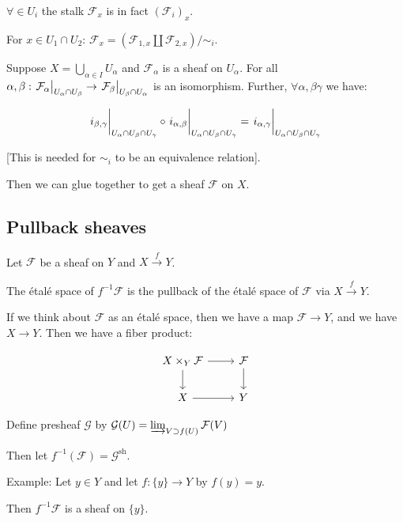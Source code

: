 \documentclass{article}
\theoremstyle{definition}
\begin{document}
    \(\forall \in U_i\) the stalk \(\mathcal{F}_x\) is in fact \((\mathcal{F}_i)_x\).

    For \(x\in U_1\cap U_2\): \(\mathcal{F}_x = (\mathcal{F}_{1,x} \coprod \mathcal{F}_{2,x}) / \sim_i\).

    Suppose \(X = \bigcup_{\alpha \in I} U_\alpha\) and \(\mathcal{F}_\alpha\) is a sheaf on \(U_\alpha\). For all \(\alpha , \beta : \eval{\mathcal{F}_\alpha}_{U_\alpha \cap U_\beta} \to \eval{\mathcal{F}_\beta}_{U_\beta \cap U_\alpha}\) is an isomorphism. Further, \(\forall \alpha ,\beta \gamma\) we have:

    \[
        \eval{i_{\beta, \gamma}}_{U_\alpha \cap U_\beta \cap U_\gamma} \circ \eval{i_{\alpha , \beta}}_{U_\alpha \cap U_\beta \cap U_\gamma} = \eval{i_{\alpha , \gamma}}_{U_\alpha \cap U_\beta \cap U_\gamma}
    \]

    [This is needed for \(\sim_i\) to be an equivalence relation].

    Then we can glue together to get a sheaf \(\mathcal{F}\) on \(X\).

    \subsection*{Pullback sheaves}

    Let \(\mathcal{F}\) be a sheaf on \(Y\) and \(X \xrightarrow{f} Y\).

    The \'etal\'e space of \(f^{-1} \mathcal{F}\) is the pullback of the \'etal\'e space of \(\mathcal{F}\) via \(X \xrightarrow{f} Y\).

    If we think about \(\mathcal{F}\) as an \'etal\'e space, then we have a map \(\mathcal{F} \to Y\), and we have \(X \to Y\). Then we have a fiber product:

    \[
        \begin{tikzcd}
            X \times_Y \mathcal{F} \ar[r] \ar[d] & \mathcal{F} \ar[d] \\ X \ar[r] & Y
        \end{tikzcd}
    \]

    Define presheaf \(\mathcal{G}\) by \(\mathcal{G}(U) = \varinjlim_{V \supset f(U)} \mathcal{F}(V)\)

    Then let \(f^{-1} (\mathcal{F}) = \mathcal{G}^{\operatorname{sh}}\).

    Example: Let \(y\in Y\) and let \(f: \{ y \} \to Y\) by \(f(y) = y\).

    Then \(f ^{-1} \mathcal{F}\) is a sheaf on \(\{ y \}\).
    
\end{document}
